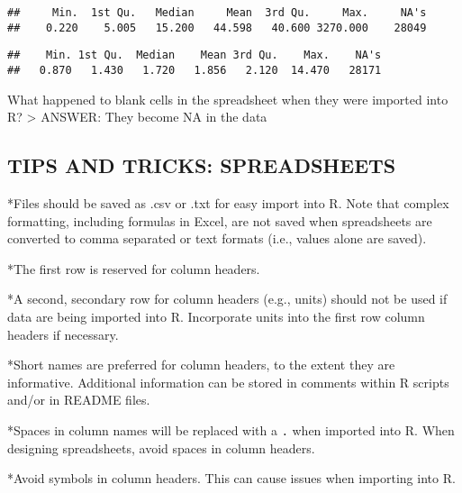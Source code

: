 \documentclass[]{article}
\newenvironment{Shaded}{\begin{snugshade}}{\end{snugshade}}
\newcommand{\KeywordTok}[1]{\textcolor[rgb]{0.13,0.29,0.53}{\textbf{#1}}}
\newcommand{\OperatorTok}[1]{\textcolor[rgb]{0.81,0.36,0.00}{\textbf{#1}}}
\newcommand{\NormalTok}[1]{#1}
\begin{document}
\begin{Shaded}
\end{Shaded}

\begin{verbatim}
##     Min.  1st Qu.   Median     Mean  3rd Qu.     Max.     NA's 
##    0.220    5.005   15.200   44.598   40.600 3270.000    28049
\end{verbatim}

\begin{Shaded}
\end{Shaded}

\begin{verbatim}
##    Min. 1st Qu.  Median    Mean 3rd Qu.    Max.    NA's 
##   0.870   1.430   1.720   1.856   2.120  14.470   28171
\end{verbatim}

What happened to blank cells in the spreadsheet when they were imported
into R? \textgreater{} ANSWER: They become NA in the data

\subsection{TIPS AND TRICKS:
SPREADSHEETS}\label{tips-and-tricks-spreadsheets}

*Files should be saved as .csv or .txt for easy import into R. Note that
complex formatting, including formulas in Excel, are not saved when
spreadsheets are converted to comma separated or text formats (i.e.,
values alone are saved).

*The first row is reserved for column headers.

*A second, secondary row for column headers (e.g., units) should not be
used if data are being imported into R. Incorporate units into the first
row column headers if necessary.

*Short names are preferred for column headers, to the extent they are
informative. Additional information can be stored in comments within R
scripts and/or in README files.

*Spaces in column names will be replaced with a \texttt{.} when imported
into R. When designing spreadsheets, avoid spaces in column headers.

*Avoid symbols in column headers. This can cause issues when importing
into R.
\end{document}
